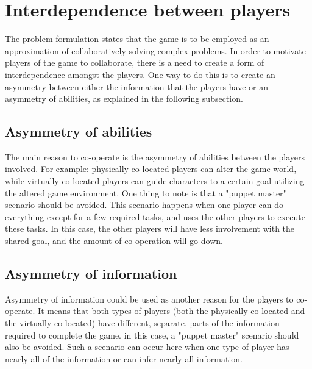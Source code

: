 	\section{Interdependence between players} \label{sec:interdependence}
		The problem formulation states that the game is to be employed as an
		approximation of collaboratively solving complex problems. In order to
		motivate players of the game to collaborate, there is a need to create
		a form of interdependence amongst the players. One way to do this is to
		create an asymmetry between either the information that the players have or
		an asymmetry of abilities, as explained in the following subsection. 
		\subsection{Asymmetry of abilities}
			The main reason to co-operate is the asymmetry of abilities between
			the players involved. For example: physically co-located players can
			alter the game world, while virtually co-located players can guide
			characters to a certain goal utilizing the altered game environment.
			One thing to note is that a "puppet master" scenario should be avoided.
			This scenario happens when one player can do everything except for a
			few required tasks, and uses the other players to execute these tasks.
			In this case, the other players will have less involvement with the
			shared goal, and the amount of co-operation will go down.
		\subsection{Asymmetry of information}
			Asymmetry of information could be used as another reason for the players
			to co-operate. It means that both types of players (both the physically
			co-located and the virtually co-located) have different, separate, parts
			of the information required to complete the game. in this case, a 
			"puppet master" scenario should also be avoided. Such a scenario can occur
			here when one type of player has nearly all of the information or can
			infer nearly all information.
		
